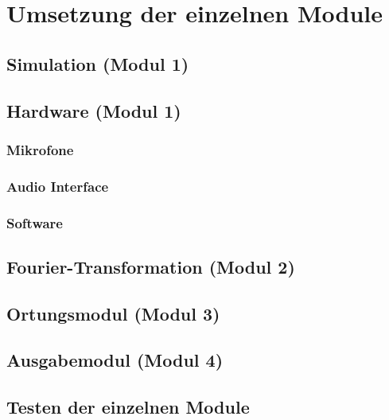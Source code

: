 \section{Umsetzung der einzelnen Module} 
      \subsection{Simulation (Modul 1)}
      \subsection{Hardware (Modul 1)}
      \subsubsection{Mikrofone}
      \subsubsection{Audio Interface}
      \subsubsection{Software}
      \subsection{Fourier-Transformation (Modul 2)}
      \subsection{Ortungsmodul (Modul 3)}
      \subsection{Ausgabemodul (Modul 4)}
      \subsection{Testen der einzelnen Module}
